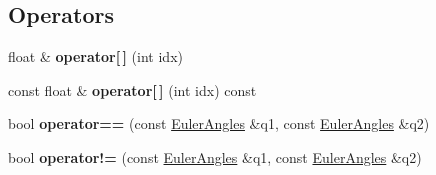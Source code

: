 \subsection*{Operators}
\begin{DoxyCompactItemize}
\item 
\mbox{\label{classrev_1_1_euler_angles_a19e4fde565864adbdbfe2986b7c8c4d4}} 
float \& {\bfseries operator\mbox{[}$\,$\mbox{]}} (int idx)
\item 
\mbox{\label{classrev_1_1_euler_angles_a27bebbd576168984420de01af2f81a3e}} 
const float \& {\bfseries operator\mbox{[}$\,$\mbox{]}} (int idx) const
\item 
\mbox{\label{classrev_1_1_euler_angles_aca0a1fd40c8821eaf15ee60a8adbc4a9}} 
bool {\bfseries operator==} (const \mbox{\hyperlink{classrev_1_1_euler_angles}{Euler\+Angles}} \&q1, const \mbox{\hyperlink{classrev_1_1_euler_angles}{Euler\+Angles}} \&q2)
\item 
\mbox{\label{classrev_1_1_euler_angles_a3519d1ef8be0ba47a3e6579db5e0cd64}} 
bool {\bfseries operator!=} (const \mbox{\hyperlink{classrev_1_1_euler_angles}{Euler\+Angles}} \&q1, const \mbox{\hyperlink{classrev_1_1_euler_angles}{Euler\+Angles}} \&q2)
\end{DoxyCompactItemize}
